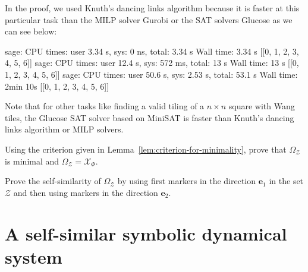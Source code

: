 \documentclass[12pt]{amsart}
\newcommand{\be}{{\boldsymbol{e}}}
\newcommand{\Xcal}{\mathcal{X}} %
\newcommand{\Zcal}{\mathcal{Z}}
\begin{document}
In the proof, we used Knuth's dancing links algorithm \cite{knuth_dancing_2000}
    because it is faster at this particular task than the MILP solver Gurobi
    \cite{gurobi} or the SAT solvers Glucose
    \cite{doi:10.1142/S0218213018400018} as we can see below:
\begin{sageverbatimtcb}
sage: %
CPU times: user 3.34 s, sys: 0 ns, total: 3.34 s
Wall time: 3.34 s
[[0, 1, 2, 3, 4, 5, 6]]
sage: %
CPU times: user 12.4 s, sys: 572 ms, total: 13 s
Wall time: 13 s
[[0, 1, 2, 3, 4, 5, 6]]
sage: %
CPU times: user 50.6 s, sys: 2.53 s, total: 53.1 s
Wall time: 2min 10s
[[0, 1, 2, 3, 4, 5, 6]]
\end{sageverbatimtcb}
    Note that for other tasks like finding a valid tiling of a $n\times n$
    square with Wang tiles, the Glucose SAT
	solver \cite{doi:10.1142/S0218213018400018} based on MiniSAT \cite{minisat}
    is faster \cite{labbe_comparison_2018}
    than Knuth's dancing links algorithm or MILP solvers.
  
\begin{exo}[label={exo:OmegaU=XPhi}]
        Using the criterion given in Lemma~\ref{lem:criterion-for-minimality},
        prove that $\Omega_\Zcal$ is minimal and $\Omega_\Zcal=\Xcal_\Phi$.
\end{exo}


\begin{exo}[label={exo:markers-e1-and-then-e2}]
    Prove the self-similarity of $\Omega_\Zcal$ by using first markers in the
    direction $\be_1$ in the set $\Zcal$ and then using markers in the
    direction $\be_2$.
\end{exo}


\section{A self-similar symbolic dynamical system}\label{chap:Labbe:sec:Z2-rotations}
\end{document}
